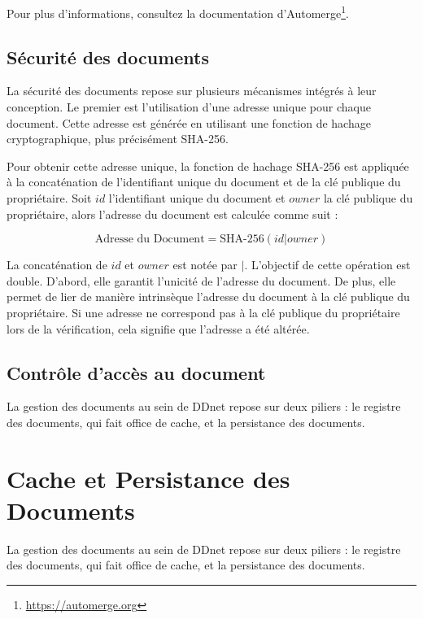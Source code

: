 Pour plus d'informations, consultez la documentation d'Automerge\footnote{\url{https://automerge.org}}.


\subsection{Sécurité des documents}

La sécurité des documents repose sur plusieurs mécanismes intégrés à leur conception. Le premier est l'utilisation d'une adresse unique pour chaque document. Cette adresse est générée en utilisant une fonction de hachage cryptographique, plus précisément SHA-256.

Pour obtenir cette adresse unique, la fonction de hachage SHA-256 est appliquée à la concaténation de l'identifiant unique du document et de la clé publique du propriétaire. Soit $id$ l'identifiant unique du document et $owner$ la clé publique du propriétaire, alors l'adresse du document est calculée comme suit :

\begin{equation}
    \text{Adresse du Document} = \text{SHA-256}(id | owner)
\end{equation}

La concaténation de $id$ et $owner$ est notée par \guillemotleft $|$\guillemotright. L'objectif de cette opération est double. D'abord, elle garantit l'unicité de l'adresse du document. De plus, elle permet de lier de manière intrinsèque l'adresse du document à la clé publique du propriétaire. Si une adresse ne correspond pas à la clé publique du propriétaire lors de la vérification, cela signifie que l'adresse a été altérée.

\subsection{Contrôle d'accès au document}

La gestion des documents au sein de \Gls{DDnet} repose sur deux piliers : le registre des documents, qui fait office de cache, et la persistance des documents.

\section{Cache et Persistance des Documents}

La gestion des documents au sein de \Gls{DDnet} repose sur deux piliers : le registre des documents, qui fait office de cache, et la persistance des documents.

